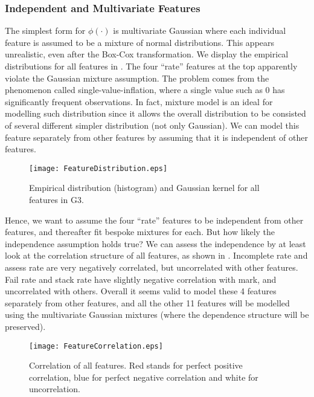 \subsubsection{Independent and Multivariate Features}

The simplest form for $\phi(\cdot)$ is multivariate Gaussian where each individual feature is assumed to be a mixture of normal distributions. This appears unrealistic, even after the Box-Cox transformation. We display the empirical distributions for all features in . The four ``rate'' features at the top apparently violate the Gaussian mixture assumption. The problem comes from the phenomenon called single-value-inflation, where a single value such as 0 has significantly frequent observations. In fact, mixture model is an ideal for modelling such distribution since it allows the overall distribution to be consisted of several different simpler distribution (not only Gaussian). We can model this feature separately from other features by assuming that it is independent of other features.

\begin{figure}[!h]
\centering
\texttt{[image: FeatureDistribution.eps]}
\caption{Empirical distribution (histogram) and Gaussian kernel for all features in G3.}
\label{fig:featureDistribution}
\end{figure}

Hence, we want to assume the four ``rate'' features to be independent from other features, and thereafter fit bespoke mixtures for each. But how likely the independence assumption holds true? We can assess the independence by at least look at the correlation structure of all features, as shown in . Incomplete rate and assess rate are very negatively correlated, but uncorrelated with other features. Fail rate and stack rate have slightly negative correlation with mark, and uncorrelated with others. Overall it seems valid to model these 4 features separately from other features, and all the other 11 features will be modelled using the multivariate Gaussian mixtures (where the dependence structure will be preserved).

\begin{figure}[!h]
\centering
\texttt{[image: FeatureCorrelation.eps]}
\caption{Correlation of all features. Red stands for perfect positive correlation, blue for perfect negative correlation and white for uncorrelation.}
\label{fig:featureCorrelation}
\end{figure}

